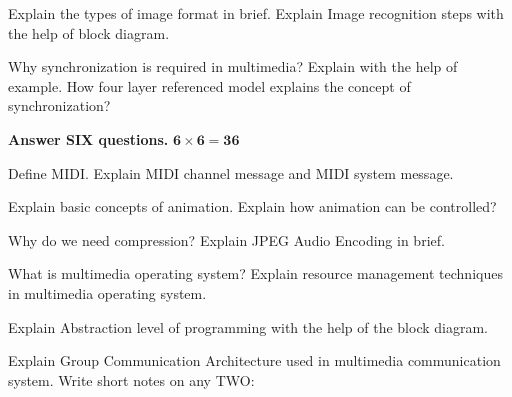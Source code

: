 \documentclass[a4paper, twoside, 12pt, noanswers]{exam}
\begin{document}
\begin{questions}
  \question

  \question Explain the types of image format in brief. Explain Image
  recognition steps with the help of block diagram.

  \question Why synchronization is required in multimedia? Explain with the
  help of example. How four layer referenced model explains the
  concept of synchronization?
	

{\par}
{\hspace*{-0.5cm}\noindent\bfseries Answer SIX questions.} \hfill {\( \mathbf{6 \times 6 = 36}\)}

\question Define MIDI. Explain MIDI channel message and MIDI system
message.

\question Explain basic concepts of animation. Explain how animation can
be controlled?

\question Why do we need compression? Explain JPEG Audio Encoding in
brief.

\question What is multimedia operating system? Explain resource
management techniques in multimedia operating system.

\question Explain Abstraction level of programming with the help of the
block diagram.

\question Explain Group Communication Architecture used in multimedia
communication system.
\question Write short notes on any TWO:

\end{questions}
\end{document}
